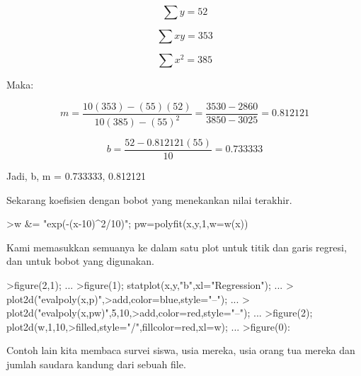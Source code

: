 \documentclass{article}
\begin{document}
\begin{eulernotebook}
\begin{eulercomment}
\begin{eulercomment}
\begin{eulerformula}
\[
\sum y = 52
\]
\end{eulerformula}
\begin{eulerformula}
\[
\sum xy = 353
\]
\end{eulerformula}
\begin{eulerformula}
\[
\sum x^2 = 385
\]
\end{eulerformula}
\begin{eulercomment}
Maka:\\
\end{eulercomment}
\begin{eulerformula}
\[
m = \frac{10 (353) - (55)(52)}{10 (385) - (55)^2} = \frac {3530-2860}{3850-3025} = 0.812121
\]
\end{eulerformula}
\begin{eulerformula}
\[
b = \frac{52 - 0.812121 (55)}{10}=0.733333
\]
\end{eulerformula}
\begin{eulercomment}
Jadi, b, m = 0.733333, 0.812121


Sekarang koefisien dengan bobot yang menekankan nilai terakhir.
\end{eulercomment}
\begin{eulerprompt}
>w &= "exp(-(x-10)^2/10)"; pw=polyfit(x,y,1,w=w(x))
\end{eulerprompt}
\begin{euleroutput}
  [4.71566,  0.38319]
\end{euleroutput}
\begin{eulercomment}
Kami memasukkan semuanya ke dalam satu plot untuk titik dan garis
regresi, dan untuk bobot yang digunakan.
\end{eulercomment}
\begin{eulerprompt}
>figure(2,1);  ...
>figure(1); statplot(x,y,"b",xl="Regression"); ...
>  plot2d("evalpoly(x,p)",>add,color=blue,style="--"); ...
>  plot2d("evalpoly(x,pw)",5,10,>add,color=red,style="--"); ...
>figure(2); plot2d(w,1,10,>filled,style="/",fillcolor=red,xl=w); ...
>figure(0):
\end{eulerprompt}
\begin{eulercomment}
Contoh lain kita membaca survei siswa, usia mereka, usia orang tua
mereka dan jumlah saudara kandung dari sebuah file.


\end{eulercomment}
\end{eulercomment}
\end{eulercomment}
\end{eulernotebook}
\end{document}
